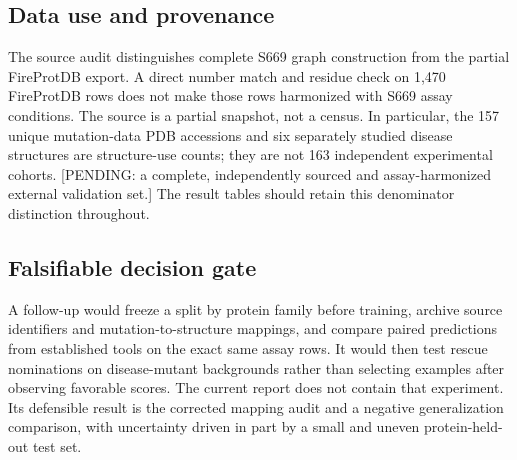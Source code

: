 \subsection{Data use and provenance}
The source audit distinguishes complete S669 graph construction from the partial FireProtDB export. A direct number match and residue check on 1,470 FireProtDB rows does not make those rows harmonized with S669 assay conditions. The source is a partial snapshot, not a census. In particular, the 157 unique mutation-data PDB accessions and six separately studied disease structures are structure-use counts; they are not 163 independent experimental cohorts. [PENDING: a complete, independently sourced and assay-harmonized external validation set.] The result tables should retain this denominator distinction throughout.

\subsection{Falsifiable decision gate}
A follow-up would freeze a split by protein family before training, archive source identifiers and mutation-to-structure mappings, and compare paired predictions from established tools on the exact same assay rows. It would then test rescue nominations on disease-mutant backgrounds rather than selecting examples after observing favorable scores. The current report does not contain that experiment. Its defensible result is the corrected mapping audit and a negative generalization comparison, with uncertainty driven in part by a small and uneven protein-held-out test set.
